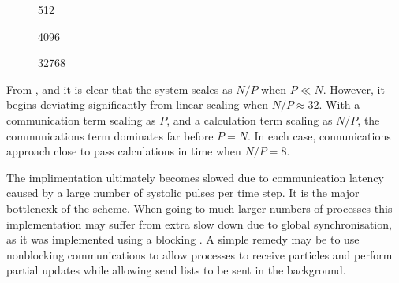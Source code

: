 %
%
\begin{figure}[!h]
    
    \caption{
        \vZeroTimeCaption
            {\systolicloop{}}
            {\pairoperation{}}
            {512}
    }
    \label{fig:v0_systolic_pair_operation_512_logtime}
\end  {figure}

\begin{figure}[!h]
    
    \caption{
        \vZeroTimeCaption
        {\systolicloop{}}
        {\pairoperation{}}
        {4096}
    }
    \label{fig:v0_systolic_pair_operation_4096_logtime}
\end  {figure}

\begin{figure}[!h]
    
    \caption{
        \vZeroTimeCaption
            {\systolicloop{}}
            {\pairoperation{}}
            {32768}
    }
    \label{fig:v0_systolic_pair_operation_32768_logtime}
\end  {figure}

\vZeroTimeExplanation
{}
{}
{}
{\pairoperation{}}
{\systolicloop{}}

%
From
,
 and
it is clear that the system scales as $N/P$ when $P \ll{} N$.
%
However, it begins deviating significantly from linear scaling
when $N/P \approx{} 32$.
%
With a communication term scaling as $P$, and a calculation term
scaling as $N/P$, the communications term dominates far before $P = N$.
%
In each case, connunications approach close to pass calculations in time
when $N/P = 8$.

The implimentation ultimately becomes slowed due to
communication latency caused by a large number
of systolic pulses per time step.
%
It is the major bottlenexk of the scheme.
%
When going to much larger numbers of processes
this implementation may suffer from extra slow down due to
global synchronisation, as it was implemented using a blocking
\mpisendrecv{}.
%
A simple remedy may be to use nonblocking communications to allow
processes to receive particles and perform partial updates while
allowing send lists to be sent in the background.
